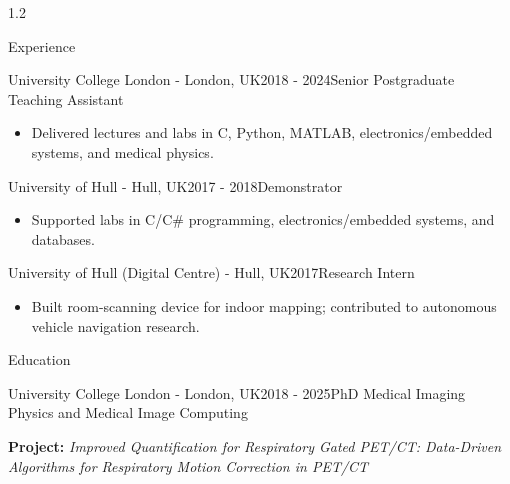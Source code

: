 \documentclass{cv}
\begin{document}
\begin{spacing}{1.2}
\begin{rSection}{Experience}
            \item \begin{rSubsection}{University College London \textnormal{- London, UK}}{2018 - 2024}{Senior Postgraduate Teaching Assistant}{}
                \item \begin{itemize}
                    \item Delivered lectures and labs in C, Python, MATLAB, electronics/embedded systems, and medical physics.
                \end{itemize}
            \end{rSubsection}
            
            \item \begin{rSubsection}{University of Hull \textnormal{- Hull, UK}}{2017 - 2018}{Demonstrator}{}
                \item \begin{itemize}
                    \item Supported labs in C/C\# programming, electronics/embedded systems, and databases.
                \end{itemize}
            \end{rSubsection}
            
            \item \begin{rSubsection}{University of Hull (Digital Centre) \textnormal{- Hull, UK}}{2017}{Research Intern}{}
                \item \begin{itemize}
                    \item Built room-scanning device for indoor mapping; contributed to autonomous vehicle navigation research.
                \end{itemize}
            \end{rSubsection}
        \end{rSection}
        
        \begin{rSection}{Education}
            \item \begin{rSubsection}{University College London \textnormal{- London, UK}}{2018 - 2025}{PhD Medical Imaging Physics and Medical Image Computing}{}            
                \item \textbf{Project:} \textit{Improved Quantification for Respiratory Gated PET/CT: Data-Driven Algorithms for Respiratory Motion Correction in PET/CT}
                

\end{rSubsection}
\end{rSection}
\end{spacing}
\end{document}
